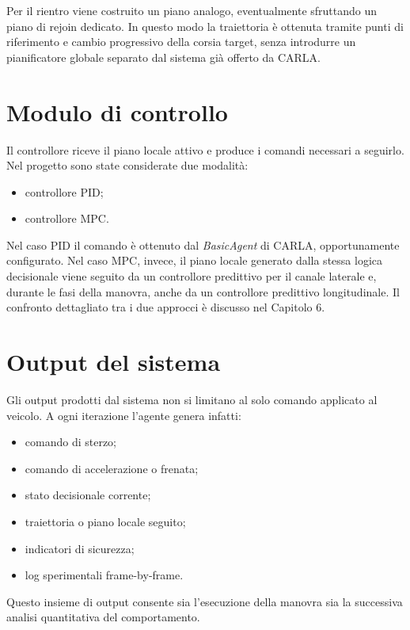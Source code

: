 Per il rientro viene costruito un piano analogo, eventualmente sfruttando un piano di rejoin dedicato. In questo modo la traiettoria è ottenuta tramite punti di riferimento e cambio progressivo della corsia target, senza introdurre un pianificatore globale separato dal sistema già offerto da CARLA.

\section{Modulo di controllo}

Il controllore riceve il piano locale attivo e produce i comandi necessari a seguirlo. Nel progetto sono state considerate due modalità:

\begin{itemize}
    \item controllore PID;
    \item controllore MPC.
\end{itemize}

Nel caso PID il comando è ottenuto dal \textit{BasicAgent} di CARLA, opportunamente configurato. Nel caso MPC, invece, il piano locale generato dalla stessa logica decisionale viene seguito da un controllore predittivo per il canale laterale e, durante le fasi della manovra, anche da un controllore predittivo longitudinale. Il confronto dettagliato tra i due approcci è discusso nel Capitolo 6.

\section{Output del sistema}

Gli output prodotti dal sistema non si limitano al solo comando applicato al veicolo. A ogni iterazione l'agente genera infatti:

\begin{itemize}
    \item comando di sterzo;
    \item comando di accelerazione o frenata;
    \item stato decisionale corrente;
    \item traiettoria o piano locale seguito;
    \item indicatori di sicurezza;
    \item log sperimentali frame-by-frame.
\end{itemize}

Questo insieme di output consente sia l'esecuzione della manovra sia la successiva analisi quantitativa del comportamento.

